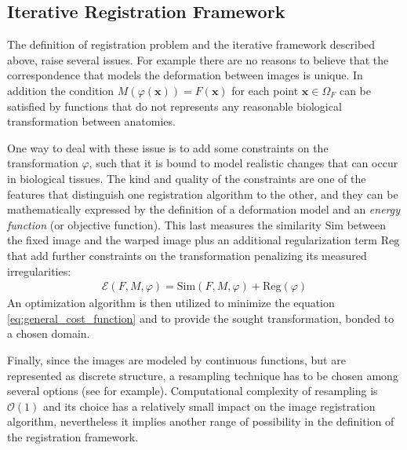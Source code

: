 \subsection{Iterative Registration Framework}

The definition of registration problem and the iterative framework described above, raise several issues. For example there are no reasons to believe that the correspondence that models the deformation between images is unique. In addition the condition $M(\varphi (\mathbf{x})) = F(\mathbf{x})$ for each point $\mathbf{x}\in \Omega_{F} $ can be satisfied by functions that do not represents any reasonable biological transformation between anatomies.

One way to deal with these issue is to add some constraints on the transformation $\varphi$, such that it is bound to model realistic changes that can occur in biological tissues. The kind and quality of the constraints are one of the features that distinguish one registration algorithm to the other, and they can be mathematically expressed by the definition of a deformation model and an \emph{energy function} (or objective function). This last measures the similarity $\text{Sim}$ between the fixed image and the warped image plus an additional regularization term $\text{Reg}$ that 
add further constraints on the transformation penalizing its measured irregularities:
\begin{align}\label{eq:general_cost_function}
\mathcal{E}(F, M, \varphi) = \text{Sim}(F,M,\varphi) + \text{Reg}(\varphi) 
\end{align}
An optimization algorithm is then utilized to minimize the equation \ref{eq:general_cost_function} and to provide the sought transformation, bonded to a chosen domain.

Finally, since the images are modeled by continuous functions, but are represented as discrete structure, a resampling technique has to be chosen among several options (see for example\cite{gonzalezdigital}). 
Computational complexity of resampling is $\mathcal{O}(1)$ and its choice has a relatively small impact on the image registration algorithm, nevertheless it implies another range of possibility in the definition of the registration framework.

